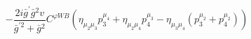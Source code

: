 %
\begin{dmath*}
%
  -  \frac{2 i {\bar g}^\prime {\bar g}{}^2 v}{{\bar g}^{\prime 2} + {\bar g}{}^2}C^{ \varphi  WB} \left(\eta_{\mu_2 \mu_3} p_3^{\mu_4} + \eta_{\mu_2 \mu_4} p_4^{\mu_3} - \eta_{\mu_3 \mu_4} \left(p_3^{\mu_2} + p_4^{\mu_2}\right)\right)
%
\end{dmath*}
%
